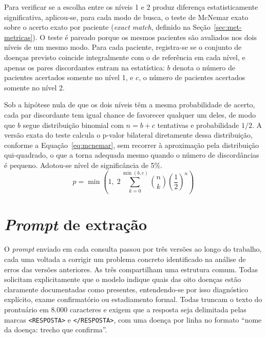Para verificar se a escolha entre os níveis 1 e 2 produz diferença estatisticamente significativa, aplicou-se, para cada modo de busca, o teste de McNemar exato sobre o acerto exato por paciente (\textit{exact match}, definido na Seção~\ref{sec:met-metricas}).
O teste é pareado porque os mesmos pacientes são avaliados nos dois níveis de um mesmo modo. Para cada paciente, registra-se se o conjunto de doenças previsto coincide integralmente com o de referência em cada nível, e apenas os pares discordantes entram na estatística: $b$ denota o número de pacientes acertados somente no nível 1, e $c$, o número de pacientes acertados somente no nível 2.

Sob a hipótese nula de que os dois níveis têm a mesma probabilidade de acerto, cada par discordante tem igual chance de favorecer qualquer um deles, de modo que $b$ segue distribuição binomial com $n = b + c$ tentativas e probabilidade $1/2$. A versão exata do teste calcula o p-valor bilateral diretamente dessa distribuição, conforme a Equação~\eqref{eq:mcnemar}, sem recorrer à aproximação pela distribuição qui-quadrado, o que a torna adequada mesmo quando o número de discordâncias é pequeno. Adotou-se nível de significância de 5\%.
\begin{equation}
p = \min\left(1,\; 2\sum_{k=0}^{\min(b,c)} \binom{n}{k}\left(\frac{1}{2}\right)^{n}\right)
\label{eq:mcnemar}
\end{equation}

\section{\texorpdfstring{\textit{Prompt}}{Prompt} de extração}\label{sec:met-prompt}

O \textit{prompt} enviado em cada consulta passou por três versões ao longo do trabalho, cada uma voltada a corrigir um problema concreto identificado na análise de erros das versões anteriores. As três compartilham uma estrutura comum. Todas solicitam explicitamente que o modelo indique quais das oito doenças estão claramente documentadas como presentes, entendendo-se por isso diagnóstico explícito, exame confirmatório ou estadiamento formal. Todas truncam o texto do prontuário em 8.000 caracteres e exigem que a resposta seja delimitada pelas marcas \texttt{<RESPOSTA>} e \texttt{</RESPOSTA>}, com uma doença por linha no formato ``nome da doença: trecho que confirma''.

